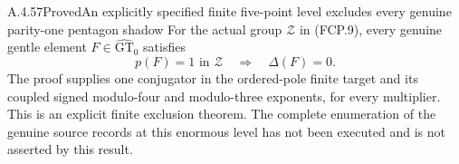 \begin{result}{A.4.57}{Proved}{An explicitly specified finite five-point level excludes every genuine parity-one pentagon shadow}
For the actual group $\mathcal Z$ in (FCP.9), every genuine
gentle element $F\in\widehat{\mathrm{GT}}_0$ satisfies
\[
            p(F)=1\text{ in }\mathcal Z
                       \quad\Longrightarrow\quad\Delta(F)=0.
                                                               \tag{FCP.10}
\]
The proof supplies one conjugator in the ordered-pole finite
target and its coupled signed modulo-four and modulo-three exponents, for
every multiplier.  This is an explicit finite exclusion
theorem.  The complete enumeration of the genuine source
records at this enormous level has not been executed and
is not asserted by this result.
\end{result}

